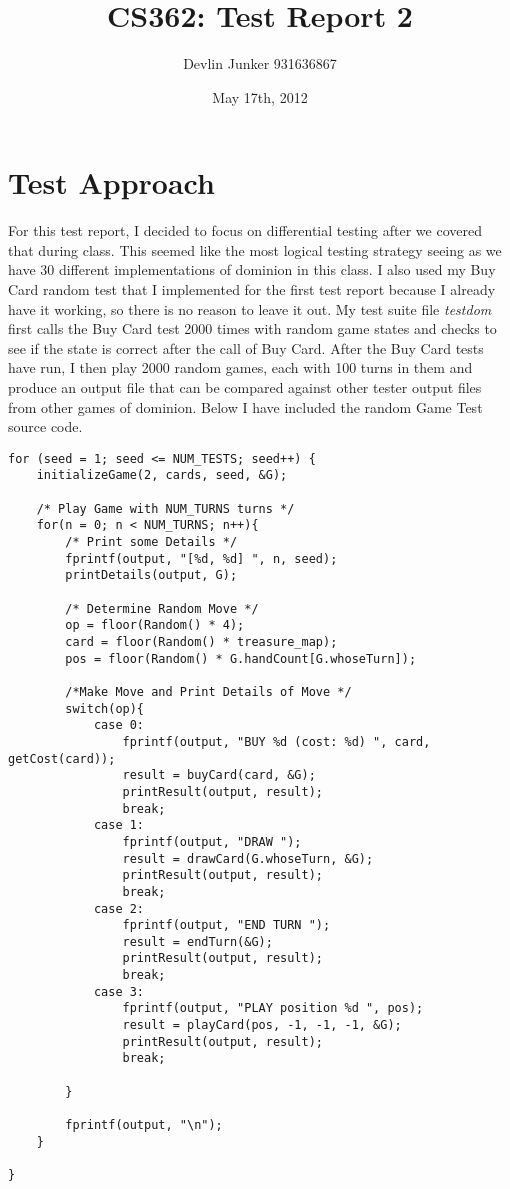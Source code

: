 \documentclass[letterpaper,12pt]{article}
\title{CS362: Test Report 2}
\date{May 17th, 2012}
\author{Devlin Junker 931636867}
\begin{document}
\maketitle


\section{Test Approach}
For this test report, I decided to focus on differential testing after we covered that during class.
This seemed like the most logical testing strategy seeing as we have 30 different implementations of
dominion in this class. I also used my Buy Card random test that I implemented for the first test report
because I already have it working, so there is no reason to leave it out. My test suite file \emph{testdom}
first calls the Buy Card test 2000 times with random game states and checks to see if the state is correct
after the call of Buy Card. After the Buy Card tests have run, I then play 2000 random games, each with 100
turns in them and produce an output file that can be compared against other tester output files from other
games of dominion. Below I have included the random Game Test source code.


\begin{verbatim}
for (seed = 1; seed <= NUM_TESTS; seed++) {
	initializeGame(2, cards, seed, &G);

	/* Play Game with NUM_TURNS turns */
	for(n = 0; n < NUM_TURNS; n++){
		/* Print some Details */
		fprintf(output, "[%d, %d] ", n, seed);
		printDetails(output, G);
		
		/* Determine Random Move */
		op = floor(Random() * 4);
		card = floor(Random() * treasure_map);
		pos = floor(Random() * G.handCount[G.whoseTurn]);
		
		/*Make Move and Print Details of Move */
		switch(op){
			case 0:
				fprintf(output, "BUY %d (cost: %d) ", card, getCost(card));
				result = buyCard(card, &G);
				printResult(output, result);
				break;
			case 1:
				fprintf(output, "DRAW ");
				result = drawCard(G.whoseTurn, &G);
				printResult(output, result);
				break;
			case 2:
				fprintf(output, "END TURN ");
				result = endTurn(&G);
				printResult(output, result);
				break;
			case 3:
				fprintf(output, "PLAY position %d ", pos);
				result = playCard(pos, -1, -1, -1, &G);
				printResult(output, result);
				break;
				
		}
		
		fprintf(output, "\n");
	}
	
}
\end{verbatim}
\end{document}
